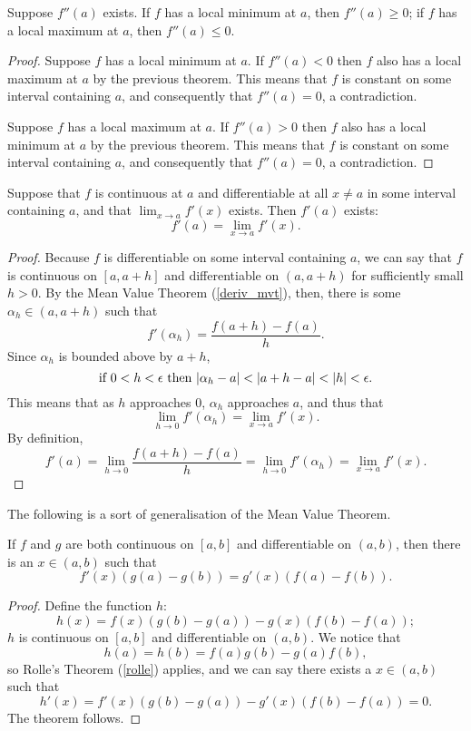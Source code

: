 \begin{theorem} \label{minmaxtwoderiv}
Suppose $f''(a)$ exists. If $f$ has a local minimum at $a$, then $f''(a) \ge 0$; if $f$ has a local maximum at $a$, then $f''(a) \le 0$.

\begin{proof}
Suppose $f$ has a local minimum at $a$. If $f''(a) < 0$ then $f$ also has a local maximum at $a$ by the previous theorem. This means that $f$ is constant on some interval containing $a$, and consequently that $f''(a) = 0$, a contradiction.

Suppose $f$ has a local maximum at $a$. If $f''(a) > 0$ then $f$ also has a local minimum at $a$ by the previous theorem. This means that $f$ is constant on some interval containing $a$, and consequently that $f''(a) = 0$, a contradiction.
\end{proof}
\end{theorem}

\begin{theorem} \label{limderiv}
Suppose that $f$ is continuous at $a$ and differentiable at all $x \ne a$ in some interval containing $a$, and that $\lim_{x \to a} f'(x)$ exists. Then $f'(a)$ exists:
\[ f'(a) = \lim_{x \to a} f'(x). \]

\begin{proof}
Because $f$ is differentiable on some interval containing $a$, we can say that $f$ is continuous on $[a, a+h]$ and differentiable on $(a, a+h)$ for sufficiently small $h > 0$. By the Mean Value Theorem (\ref{deriv_mvt}), then, there is some $\alpha_h 
\in (a, a+h)$ such that
\[ f'(\alpha_h) = \frac{f(a+h)-f(a)}h. \]
Since $\alpha_h$ is bounded above by $a+h$, 
\[ \rmif\ 0 < h < \epsilon\ \rmthen\ |\alpha_h - a| < |a + h - a| < |h| < \epsilon. \]
This means that as $h$ approaches 0, $\alpha_h$ approaches $a$, and thus that
\[ \lim_{h \to 0} f'(\alpha_h) = \lim_{x \to a} f'(x). \]
By definition, 
\[ f'(a) = \lim_{h \to 0} \frac{f(a+h)-f(a)}{h} = \lim_{h \to 0} f'(\alpha_h) = \lim_{x \to a} f'(x). \]
\end{proof}
\end{theorem}

The following is a sort of generalisation of the Mean Value Theorem.

\begin{theorem} \label{cauchy_mvt}
If $f$ and $g$ are both continuous on $[a, b]$ and differentiable on $(a, b)$, then there is an $x \in (a, b)$ such that
\[ f'(x)(g(a)-g(b)) = g'(x)(f(a)-f(b)). \]

\begin{proof}
Define the function $h$:
\[ h(x) = f(x)(g(b)-g(a)) - g(x)(f(b)-f(a)); \]
$h$ is continuous on $[a, b]$ and differentiable on $(a, b)$. We notice that
\[ h(a) = h(b) = f(a)g(b) - g(a)f(b), \]
so Rolle's Theorem (\ref{rolle}) applies, and we can say there exists a $x \in (a, b)$ such that 
\[ h'(x) = f'(x)(g(b)-g(a)) - g'(x)(f(b)-f(a)) = 0. \]
The theorem follows.
\end{proof}
\end{theorem}

